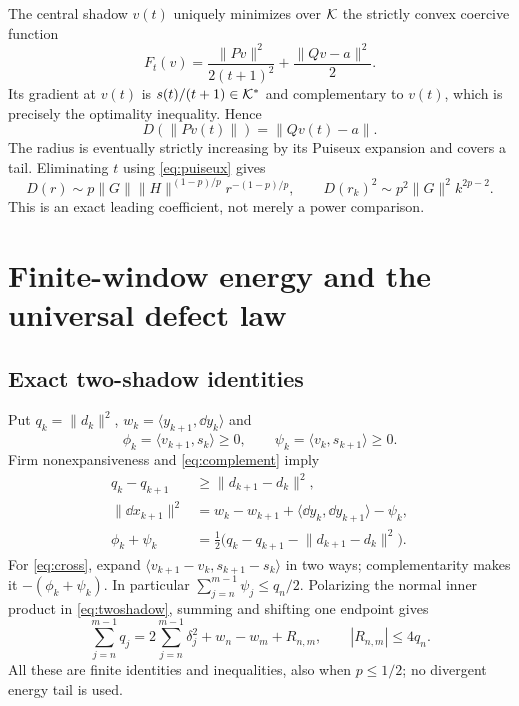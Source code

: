\documentclass[11pt]{article}
\theoremstyle{remark}\newtheorem{remark}[theorem]{Remark}
\newcommand{\ip}[2]{\langle #1,#2\rangle}\newcommand{\norm}[1]{\lVert #1\rVert}
\numberwithin{equation}{section}
\begin{document}
The central shadow $v(t)$ uniquely minimizes over $\mathcal K$ the strictly convex coercive function
\begin{equation}\label{eq:centralopt}
 F_t(v)=\frac{\norm{Pv}^2}{2(t+1)^2}+\frac{\norm{Qv-a}^2}{2}.
\end{equation}
Its gradient at $v(t)$ is $s(t)/(t+1)\in\mathcal K^*$ and complementary to $v(t)$, which is precisely the optimality inequality. Hence
\[
 D(\norm{Pv(t)})=\norm{Qv(t)-a}.
\]
The radius is eventually strictly increasing by its Puiseux expansion and covers a tail. Eliminating $t$ using \eqref{eq:puiseux} gives
\begin{equation}\label{eq:Dconstant}
 D(r)\sim p\norm G\norm H^{(1-p)/p}r^{-(1-p)/p},
 \qquad D(r_k)^2\sim p^2\norm G^2k^{2p-2}.
\end{equation}
This is an exact leading coefficient, not merely a power comparison.

\section{Finite-window energy and the universal defect law}
\subsection{Exact two-shadow identities}
Put $q_k=\norm{d_k}^2$, $w_k=\ip{y_{k+1}}{\dd y_k}$ and
\[
 \phi_k=\ip{v_{k+1}}{s_k}\geq0,\qquad
 \psi_k=\ip{v_k}{s_{k+1}}\geq0.
\]
Firm nonexpansiveness and \eqref{eq:complement} imply
\begin{align}
 q_k-q_{k+1}&\geq\norm{d_{k+1}-d_k}^2,\label{eq:qmono}\\
 \norm{\dd x_{k+1}}^2
 &=w_k-w_{k+1}+\ip{\dd y_k}{\dd y_{k+1}}-\psi_k,\label{eq:twoshadow}\\
 \phi_k+\psi_k&=\tfrac12\bigl(q_k-q_{k+1}-\norm{d_{k+1}-d_k}^2\bigr).\label{eq:cross}
\end{align}
For \eqref{eq:cross}, expand $\ip{v_{k+1}-v_k}{s_{k+1}-s_k}$ in two ways; complementarity makes it $-(\phi_k+\psi_k)$. In particular $\sum_{j=n}^{m-1}\psi_j\leq q_n/2$. Polarizing the normal inner product in \eqref{eq:twoshadow}, summing and shifting one endpoint gives
\begin{equation}\label{eq:exactenergy}
 \sum_{j=n}^{m-1}q_j=2\sum_{j=n}^{m-1}\delta_j^2+w_n-w_m+R_{n,m},
 \qquad |R_{n,m}|\leq4q_n.
\end{equation}
All these are finite identities and inequalities, also when $p\leq1/2$; no divergent energy tail is used.
\end{document}
